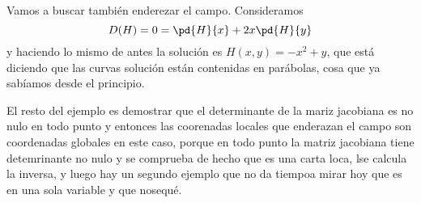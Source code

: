 Vamos a buscar también enderezar el campo. Consideramos \[ D(H) = 0 = \pd{H}{x} + 2x \pd{H}{y} \] y haciendo lo mismo de antes la solución es $H(x,y) = -x^2 + y$, que está diciendo que las curvas solución están contenidas en parábolas, cosa que ya sabíamos desde el principio.

El resto del ejemplo es demostrar que el determinante de la mariz jacobiana es no nulo en todo punto y entonces las coorenadas locales que enderazan el campo son coordenadas globales en este caso, porque en todo punto la matriz jacobiana tiene detemrinante no nulo y se comprueba de hecho que es una carta loca, lse calcula la inversa, y luego hay un segundo ejemplo que no da tiempoa mirar hoy que es en una sola variable y que nosequé.
